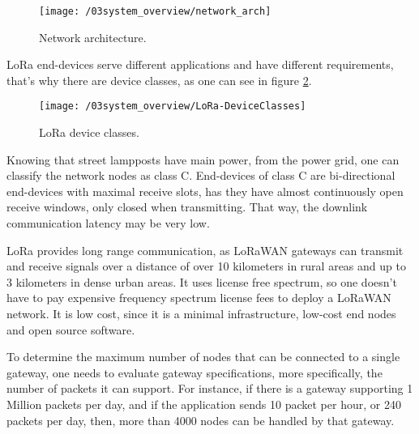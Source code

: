 \begin{figure}[ht]
	\centering
	\texttt{[image: /03system\_overview/network\_arch]}
	\caption{Network architecture.}
	\label{fig:network_arch}
\end{figure}
\clearpage

LoRa end-devices serve different applications and have different requirements, that's why there are device classes, as one can see in figure \ref{fig:lora_device_classes}.

\begin{figure}[ht]
	\centering
	\texttt{[image: /03system\_overview/LoRa-DeviceClasses]}
	\caption{LoRa device classes.}
	\label{fig:lora_device_classes}
\end{figure}

Knowing that street lampposts have main power, from the power grid, one can classify the network nodes as class C. End-devices of class C are bi-directional end-devices with maximal receive slots, has they have almost continuously open receive windows, only closed when transmitting. That way, the downlink communication latency may be very low. \cite{what_is_lorawan}

LoRa provides long range communication, as LoRaWAN gateways can transmit and receive signals over a distance of over 10 kilometers in rural areas and up to 3 kilometers in dense urban areas. It uses license free spectrum, so one doesn't have to pay expensive frequency spectrum license fees to deploy a LoRaWAN network. It is low cost, since it is a minimal infrastructure, low-cost end nodes and open source software. 

To determine the maximum number of nodes that can be connected to a single gateway, one needs to evaluate gateway specifications, more specifically, the number of packets it can support. For instance, if there is a gateway supporting 1 Million packets per day, and if the application sends 10 packet per hour, or 240 packets per day, then, more than 4000 nodes can be handled by that gateway.



